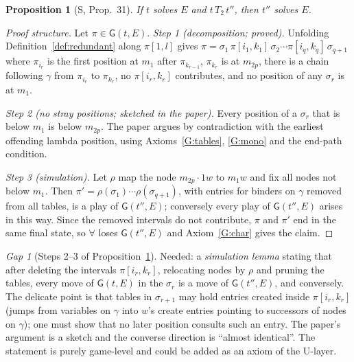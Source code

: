 \documentclass[11pt]{article}
\newcommand{\Gm}{\mathsf{G}}
\newcommand{\suc}[2]{#1{\cdot}#2}
\newcommand{\iv}[2]{\pi[#1,#2]}
\theoremstyle{plain}
\newtheorem{proposition}[theorem]{Proposition}
\theoremstyle{definition}
\theoremstyle{remark}
\newtheorem{gap}{Gap}
\begin{document}
\begin{proposition}[S, Prop.~31]\label{prop:T2}
If $t$ solves $E$ and $t\,T_2\,t''$, then $t''$ solves $E$.
\end{proposition}
\begin{proof}[Proof structure]
Let $\pi\in\Gm(t,E)$.
\emph{Step 1 (decomposition; proved).} Unfolding
Definition~\ref{def:redundant} along $\iv1l$ gives
$\pi=\sigma_1\,\iv{i_1}{k_1}\,\sigma_2\cdots\iv{i_q}{k_q}\,\sigma_{q+1}$
where $\pi_{i_r}$ is the first position at $m_1$ after $\pi_{k_{r-1}}$,
$\pi_{k_r}$ is at $m_{2p}$, there is a chain following $\gamma$ from
$\pi_{i_r}$ to $\pi_{k_r}$, no $\iv{i_r}{k_r}$ contributes, and no
position of any $\sigma_r$ is at $m_1$.

\emph{Step 2 (no stray positions; sketched in the paper).} Every position
of a $\sigma_r$ that is below $m_1$ is below $m_{2p}$.  The paper argues
by contradiction with the earliest offending lambda position, using
Axioms~\ref{G:tables}, \ref{G:mono} and the end-path condition.

\emph{Step 3 (simulation).} Let $\rho$ map the node $\suc{m_{2p}}{1}w$ to
$m_1w$ and fix all nodes not below $m_1$.  Then $\pi'=\rho(\sigma_1)\cdots
\rho(\sigma_{q+1})$, with entries for binders on $\gamma$ removed from all
tables, is a play of $\Gm(t'',E)$; conversely every play of $\Gm(t'',E)$
arises in this way.  Since the removed intervals do not contribute,
$\pi$ and $\pi'$ end in the same final state, so $\forall$ loses
$\Gm(t'',E)$ and Axiom~\ref{G:char} gives the claim.
\end{proof}

\begin{gap}[Steps 2--3 of Proposition~\ref{prop:T2}]\label{gap:T2}
Needed: a \emph{simulation lemma} stating that after deleting the
intervals $\iv{i_r}{k_r}$, relocating nodes by $\rho$ and pruning the
tables, every move of $\Gm(t,E)$ in the $\sigma_r$ is a move of
$\Gm(t'',E)$, and conversely.  The delicate point is that tables in
$\sigma_{r+1}$ may hold entries created inside $\iv{i_r}{k_r}$ (jumps
from variables on $\gamma$ into $w$'s create entries pointing to
successors of nodes on $\gamma$); one must show that no later position
consults such an entry.  The paper's argument is a sketch and the
converse direction is ``almost identical''.  The statement is purely
game-level and could be added as an axiom of the U-layer.
\end{gap}
\end{document}
